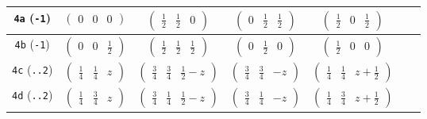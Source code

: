 \documentclass[fleqn,9pt,landscape]{jsarticle}
\begin{document}
\begin{center}
\begin{longtable}{ccccccc}
{\tt 4a} ({\tt -1}) & $ \begin{pmatrix} 0 & 0 & 0 \end{pmatrix} $ & $ \begin{pmatrix} \frac{1}{2} & \frac{1}{2} & 0 \end{pmatrix} $ & $ \begin{pmatrix} 0 & \frac{1}{2} & \frac{1}{2} \end{pmatrix} $ & $ \begin{pmatrix} \frac{1}{2} & 0 & \frac{1}{2} \end{pmatrix} $ & $  $ & $  $ \\ \hline
{\tt 4b} ({\tt -1}) & $ \begin{pmatrix} 0 & 0 & \frac{1}{2} \end{pmatrix} $ & $ \begin{pmatrix} \frac{1}{2} & \frac{1}{2} & \frac{1}{2} \end{pmatrix} $ & $ \begin{pmatrix} 0 & \frac{1}{2} & 0 \end{pmatrix} $ & $ \begin{pmatrix} \frac{1}{2} & 0 & 0 \end{pmatrix} $ & $  $ & $  $ \\ \hline
{\tt 4c} ({\tt ..2}) & $ \begin{pmatrix} \frac{1}{4} & \frac{1}{4} & z \end{pmatrix} $ & $ \begin{pmatrix} \frac{3}{4} & \frac{3}{4} & \frac{1}{2} - z \end{pmatrix} $ & $ \begin{pmatrix} \frac{3}{4} & \frac{3}{4} & - z \end{pmatrix} $ & $ \begin{pmatrix} \frac{1}{4} & \frac{1}{4} & z + \frac{1}{2} \end{pmatrix} $ & $  $ & $  $ \\ \hline
{\tt 4d} ({\tt ..2}) & $ \begin{pmatrix} \frac{1}{4} & \frac{3}{4} & z \end{pmatrix} $ & $ \begin{pmatrix} \frac{3}{4} & \frac{1}{4} & \frac{1}{2} - z \end{pmatrix} $ & $ \begin{pmatrix} \frac{3}{4} & \frac{1}{4} & - z \end{pmatrix} $ & $ \begin{pmatrix} \frac{1}{4} & \frac{3}{4} & z + \frac{1}{2} \end{pmatrix} $ & $  $ & $  $ \\ \hline

\end{longtable}
\end{center}
\end{document}
